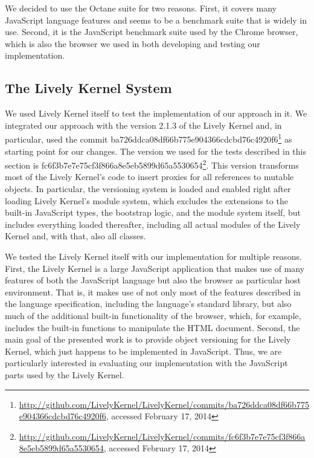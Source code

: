 We decided to use the Octane suite for two reasons.
First, it covers many JavaScript language features and seems to be a benchmark suite that is widely in use.
Second, it is the JavaScript benchmark suite used by the Chrome browser, which is also the browser we used in both developing and testing our implementation.


\subsection{The Lively Kernel System}

We used Lively Kernel itself to test the implementation of our approach in it.
We integrated our approach with the version 2.1.3 of the Lively Kernel and, in particular, used the commit ba726ddca08df66b775e904366cdcbd76c4920f6\footnote{\url{http://github.com/LivelyKernel/LivelyKernel/commits/ba726ddca08df66b775e904366cdcbd76c4920f6}, accessed February 17, 2014} as starting point for our changes.
The version we used for the tests described in this section is fc6f3b7e7e75cf3f866a8e5eb5899d65a5530654\footnote{\url{http://github.com/LivelyKernel/LivelyKernel/commits/fc6f3b7e7e75cf3f866a8e5eb5899d65a5530654}, accessed February 17, 2014}.
This version transforms most of the Lively Kernel's code to insert proxies for all references to mutable objects.
In particular, the versioning system is loaded and enabled right after loading Lively Kernel's module system, which excludes the extensions to the built-in JavaScript types, the bootstrap logic, and the module system itself, but includes everything loaded thereafter, including all actual modules of the Lively Kernel and, with that, also all classes.

We tested the Lively Kernel itself with our implementation for multiple reasons.
First, the Lively Kernel is a large JavaScript application that makes use of many features of both the JavaScript language but also the browser as particular host environment.
That is, it makes use of not only most of the features described in the language specification, including the language's standard library, but also much of the additional built-in functionality of the browser, which, for example, includes the built-in functions to manipulate the HTML document.
Second, the main goal of the presented work is to provide object versioning for the Lively Kernel, which just happens to be implemented in JavaScript.
Thus, we are particularly interested in evaluating our implementation with the JavaScript parts used by the Lively Kernel.



